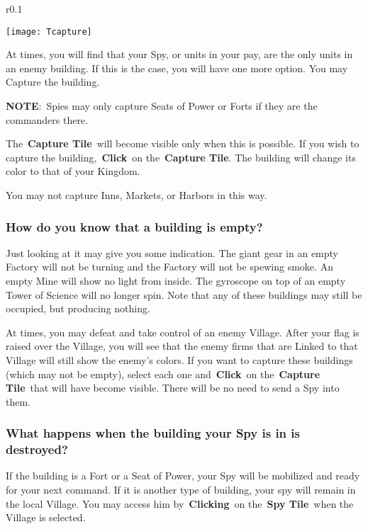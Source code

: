 \begin{wrapfigure}{r}{0.1\textwidth}
	\vspace{-20pt}
	\begin{center}
		\texttt{[image: Tcapture]}
	\end{center}
	\vspace{-20pt}
\end{wrapfigure}

At times, you will find that your Spy, or units in your pay, are the only units in an enemy building. If this is the case, you will have one more option. You may Capture the building.

\textbf{NOTE}: Spies may only capture Seats of Power or Forts if they are the commanders there.

The \textbf{Capture Tile} will become visible only when this is possible. If you wish to capture the building, \textbf{Click} on the \textbf{Capture Tile}. The building will change its color to that of your Kingdom.

You may not capture Inns, Markets, or Harbors in this way.

\subsubsection{How do you know that a building is empty?}

Just looking at it may give you some indication. The giant gear in an empty Factory will not be turning and the Factory will not be spewing smoke. An empty Mine will show no light from inside. The gyroscope on top of an empty Tower of Science will no longer spin. Note that any of these buildings may still be occupied, but producing nothing.

At times, you may defeat and take control of an enemy Village. After your flag is raised over the Village, you will see that the enemy firms that are Linked to that Village will still show the enemy’s colors. If you want to capture these buildings (which may not be empty), select each one and \textbf{Click} on the \textbf{Capture Tile} that will have become visible. There will be no need to send a Spy into them.

\subsubsection{What happens when the building your Spy is in is destroyed?}

If the building is a Fort or a Seat of Power, your Spy will be mobilized and ready for your next command. If it is another type of building, your spy will remain in the local Village. You may access him by \textbf{Clicking} on the \textbf{Spy Tile} when the Village is selected.

